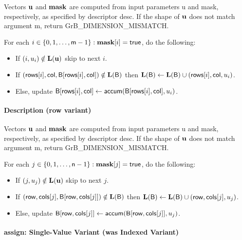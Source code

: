 Vectors ${\bf u}$ and ${\bf mask}$ are computed from input parameters {\sf u} and {\sf mask}, respectively,
as specified by descriptor {\sf desc}. If the shape of ${\bf u}$ does not match argument {\sf m},
return {\sf GrB\_DIMENSION\_MISMATCH}.

For each $i \in \{0, 1, \ldots, {\sf m}-1 \} : {\bf mask}[i] = {\sf true}$, do the following:
\begin{itemize}
	\item[] If $(i,u_{i}) \notin \bold{L}({\bf u})$ skip to next $i$.
	\item[] If $({\sf rows}[i], {\sf col}, {\sf B}[{\sf rows}[i],{\sf col}]) \notin \bold{L}({\sf B})$ then
	      $\bold{L}({\sf B}) \leftarrow \bold{L}({\sf B}) \cup ({\sf rows}[i],{\sf col},u_{i})$.
	\item[]  Else, update ${\sf B}[{\sf rows}[i],{\sf col}] \leftarrow {\sf accum}({\sf B}[{\sf rows}[i],{\sf col}],u_{i})$.
\end{itemize}

\paragraph{Description (row variant)}

Vectors ${\bf u}$ and ${\bf mask}$ are computed from input parameters {\sf u} and {\sf mask}, respectively,
as specified by descriptor {\sf desc}. If the shape of ${\bf u}$ does not match argument {\sf m},
return {\sf GrB\_DIMENSION\_MISMATCH}.

For each $j \in \{0, 1, \ldots, {\sf n}-1 \} : {\bf mask}[j] = {\sf true}$, do the following:
\begin{itemize}
	\item[] If $(j,u_{j}) \notin \bold{L}({\bf u})$ skip to next $j$.
	\item[] If $({\sf row}, {\sf cols}[j], {\sf B}[{\sf row},{\sf cols}[j]]) \notin \bold{L}({\sf B})$ then
	      $\bold{L}({\sf B}) \leftarrow \bold{L}({\sf B}) \cup ({\sf row},{\sf cols}[j],u_{j})$.
	\item[]  Else, update ${\sf B}[{\sf row},{\sf cols}[j]] \leftarrow {\sf accum}({\sf B}[{\sf row},{\sf cols}[j]],u_{j})$.
\end{itemize}

\paragraph{{\sf assign}: Single-Value Variant (was Indexed Variant)}

